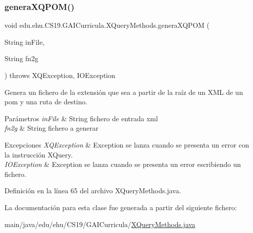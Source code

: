 \subsubsection{\texorpdfstring{generaXQPOM()}{generaXQPOM()}}
{\footnotesize\ttfamily void edu.\+ehu.\+C\+S19.\+G\+A\+I\+Curricula.\+X\+Query\+Methods.\+genera\+X\+Q\+P\+OM (\begin{DoxyParamCaption}\item[{String}]{in\+File,  }\item[{String}]{fn2g }\end{DoxyParamCaption}) throws X\+Q\+Exception, I\+O\+Exception}



Genera un fichero de la extensión que sea a partir de la raíz de un X\+ML de un pom y una ruta de destino. 


\begin{DoxyParams}{Parámetros}
{\em in\+File} & String fichero de entrada xml \\
\hline
{\em fn2g} & String fichero a generar \\
\hline
\end{DoxyParams}

\begin{DoxyExceptions}{Excepciones}
{\em X\+Q\+Exception} & Exception se lanza cuando se presenta un error con la instrucción X\+Query. \\
\hline
{\em I\+O\+Exception} & Exception se lanza cuando se presenta un error escribiendo un fichero. \\
\hline
\end{DoxyExceptions}


Definición en la línea 65 del archivo X\+Query\+Methods.\+java.



La documentación para esta clase fue generada a partir del siguiente fichero\+:\begin{DoxyCompactItemize}
\item 
main/java/edu/ehu/\+C\+S19/\+G\+A\+I\+Curricula/\mbox{\hyperlink{_x_query_methods_8java}{X\+Query\+Methods.\+java}}\end{DoxyCompactItemize}

